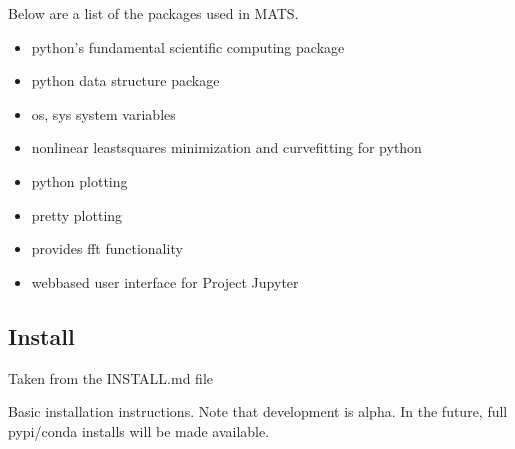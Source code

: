 \documentclass[letterpaper,10pt,english]{sphinxmanual}
\begin{document}
\sphinxAtStartPar
Below are a list of the packages used in MATS.
\begin{itemize}
\item {} 
\sphinxAtStartPar
{} \sphinxhyphen{} python’s fundamental scientific computing package

\item {} 
\sphinxAtStartPar
{} \sphinxhyphen{} python data structure package

\item {} 
\sphinxAtStartPar
os, sys \sphinxhyphen{} system variables

\item {} 
\sphinxAtStartPar
{} \sphinxhyphen{} non\sphinxhyphen{}linear least\sphinxhyphen{}squares minimization and curve\sphinxhyphen{}fitting for python

\item {} 
\sphinxAtStartPar
{} \sphinxhyphen{} python plotting

\item {} 
\sphinxAtStartPar
{} \sphinxhyphen{} pretty plotting

\item {} 
\sphinxAtStartPar
{} \sphinxhyphen{} provides fft functionality

\item {} 
\sphinxAtStartPar
{} \sphinxhyphen{} web\sphinxhyphen{}based user interface for Project Jupyter

\end{itemize}


\subsection{Install}
\label{\detokenize{Getting Started:install}}
\sphinxAtStartPar
Taken from the INSTALL.md file

\sphinxAtStartPar
Basic  installation instructions.  Note that development is alpha.  In the future, full pypi/conda installs will be made available.

\sphinxAtStartPar
{}
\end{document}
